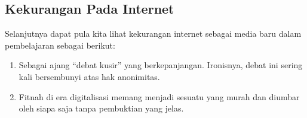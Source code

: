 \documentclass[12pt, a4paper]{article}
\begin{document}
\subsection{Kekurangan Pada Internet}
    Selanjutnya dapat pula kita lihat kekurangan internet sebagai media baru dalam pembelajaran  sebagai berikut:
\begin{enumerate}
\item Sebagai ajang “debat kusir” yang berkepanjangan. Ironisnya, debat ini sering kali bersembunyi atas hak anonimitas.
\item Fitnah di era digitalisasi memang menjadi sesuatu yang murah dan diumbar oleh siapa saja tanpa pembuktian yang jelas.
\end{enumerate}
\end{document}
